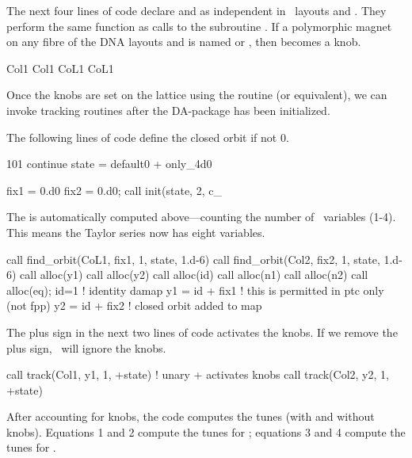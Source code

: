 %
The next four lines of code declare  and  as independent in \DNA\ layouts  and . They perform the same function as calls to the subroutine . If a polymorphic magnet on any fibre of the DNA layouts  and  is named  or , then  becomes a knob.

\begin{ptccode}
Col1%
Col1%
CoL1%
CoL1%
\end{ptccode}

Once the knobs are set on the lattice using the  routine (or equivalent), we can invoke tracking routines after the
DA-package has been initialized.

The following lines of code define the closed orbit if not 0.

\begin{ptccode}
101 continue
state = default0 + only_4d0

fix1 = 0.d0
fix2 = 0.d0;
call init(state, 2, c_%
\end{ptccode}

The  is automatically computed above---counting the number of
\DNA\ variables (1-4). This means the Taylor series now has eight variables.

%
\begin{ptccode}
call find_orbit(CoL1, fix1, 1, state, 1.d-6)
call find_orbit(Col2, fix2, 1, state, 1.d-6)
call alloc(y1)
call alloc(y2)
call alloc(id)
call alloc(n1)
call alloc(n2)
call alloc(eq);
id=1 ! identity damap
y1 = id + fix1 ! this is permitted in ptc only (not fpp)
y2 = id + fix2 ! closed orbit added to map
\end{ptccode}

The plus sign in the next two lines of code activates the knobs.
If we remove the plus sign, \PTC\ will ignore the knobs.

%
\begin{ptccode}
call track(Col1, y1, 1, +state) ! unary + activates knobs
call track(Col2, y2, 1, +state)
\end{ptccode}

%
After accounting for knobs, the code computes the tunes (with and
without knobs). Equations 1 and 2 compute the tunes for ;
equations 3 and 4 compute the tunes for .

